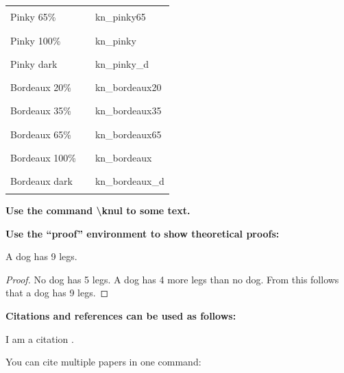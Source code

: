 \begin{center}
\begin{tabular}{@{}lll@{}}
        Pinky 65\%        & \textcolor{kn_pinky65}{\rule{1cm}{0.2cm}}       & kn\_pinky65        \\ \hdashline
        Pinky 100\%       & \textcolor{kn_pinky}{\rule{1cm}{0.2cm}}         & kn\_pinky          \\ \hdashline
        Pinky dark        & \textcolor{kn_pinky_d}{\rule{1cm}{0.2cm}}       & kn\_pinky\_d       \\ \hdashline
        Bordeaux 20\%     & \textcolor{kn_bordeaux20}{\rule{1cm}{0.2cm}}    & kn\_bordeaux20     \\ \hdashline
        Bordeaux 35\%     & \textcolor{kn_bordeaux35}{\rule{1cm}{0.2cm}}    & kn\_bordeaux35     \\ \hdashline
        Bordeaux 65\%     & \textcolor{kn_bordeaux65}{\rule{1cm}{0.2cm}}    & kn\_bordeaux65     \\ \hdashline
        Bordeaux 100\%    & \textcolor{kn_bordeaux}{\rule{1cm}{0.2cm}}      & kn\_bordeaux       \\ \hdashline
        Bordeaux dark     & \textcolor{kn_bordeaux_d}{\rule{1cm}{0.2cm}}    & kn\_bordeaux\_d    \\ \bottomrule
    \end{tabular}
\end{center}

\textbf{Use the command \textbackslash knul to  some text.}

\textbf{Use the \enquote{proof} environment to show theoretical proofs:}

\begin{theorem}
    A dog has 9 legs.
\end{theorem}

\begin{proof}
    No dog has 5 legs. A dog has 4 more legs than no dog. From this follows that
    a dog has 9 legs.
\end{proof}


\textbf{Citations and references can be used as follows:}

I am a citation \cite{Beck2020-12-17Puzzl-48882}.

You can cite multiple papers in one command: \cite{bast2013delay,
bast2013result, bast2014frequency, bast2016scalable, bast2020metro,
bast2021metro, Beck2020-12-17Puzzl-48882, eisner2011algorithms,
eisner2011optimal, funke2013polynomial, funke2014k, funke2015automatic}
\cite{storandt2012route, storandt2012quick, storandt2012cruising,
funke2017personal, funke2016deducing, funke2015placement}


